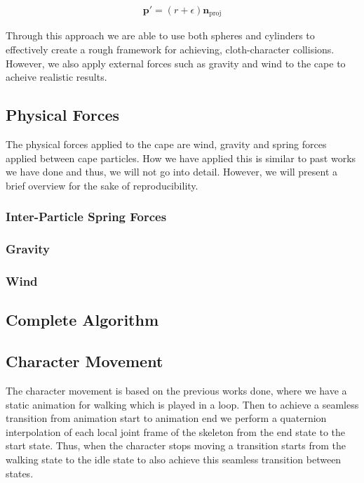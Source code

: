 \documentclass{article}
\begin{document}
\begin{align}
  \mathbf{p}' = (r + \epsilon) \mathbf{n}_{\text{proj}}
\end{align}

Through this approach we are able to use both spheres and cylinders to effectively create a rough framework
for achieving, cloth-character collisions. However, we also apply external forces such as gravity and wind to
the cape to acheive realistic results.

\subsection{Physical Forces}

The physical forces applied to the cape are wind, gravity and spring forces applied between cape particles.
How we have applied this is similar to past works we have done and thus, we will not go into detail. However,
we will present a brief overview for the sake of reproducibility.

\subsubsection{Inter-Particle Spring Forces}

\subsubsection{Gravity}

\subsubsection{Wind}

\subsection{Complete Algorithm}

\subsection{Character Movement}

The character movement is based on the previous works done, where we have a static animation for walking which
is played in a loop. Then to achieve a seamless transition from animation start to animation end we perform a
quaternion interpolation of each local joint frame of the skeleton from the end state to the start state.
Thus, when the character stops moving a transition starts from the walking state to the idle state to also 
achieve this seamless transition between states.
\end{document}
